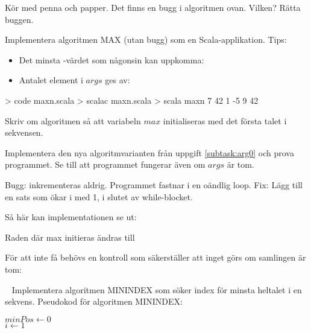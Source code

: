 \Subtask Kör med penna och papper. Det finns en bugg i algoritmen ovan. Vilken? Rätta buggen.

\Subtask Implementera algoritmen MAX (utan bugg) som en Scala-applikation. Tips:
\begin{itemize}[noitemsep, nolistsep]
\item Det minsta -värdet som någonsin kan uppkomma: 
\item Antalet element i $args$ ges av: 
\end{itemize}

\begin{REPL}
> code maxn.scala
> scalac maxn.scala
> scala maxn 7 42 1 -5 9
42
\end{REPL}

\Subtask \label{subtask:arg0} Skriv om algoritmen så att variabeln $max$ initialiseras med det första talet i sekvensen.

\Subtask Implementera den nya algoritmvarianten från uppgift \ref{subtask:arg0} och prova programmet. Se till att programmet fungerar även om $args$ är tom.

\SOLUTION


\TaskSolved \what


\SubtaskSolved  Bugg:  inkrementeras aldrig. Programmet fastnar i en oändlig loop. Fix: Lägg till en sats som ökar i med 1, i slutet av while-blocket.

\SubtaskSolved  Så här kan implementationen se ut:

\SubtaskSolved  Raden där max initieras ändras till 

\SubtaskSolved  För att inte få  behövs en kontroll som säkerställer att inget görs om samlingen  är tom:



\QUESTEND






\QUESTBEGIN

\Task \label{task:minindex} \what~  Implementera algoritmen MININDEX som söker index för minsta heltalet i en sekvens. Pseudokod för algoritmen MININDEX:

\begin{algorithm}[H]

 $minPos \leftarrow 0 $\\
 $i \leftarrow 1$ \\
\end{algorithm}

